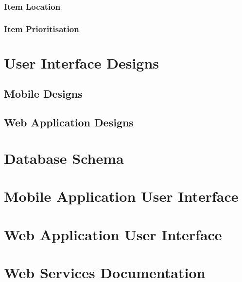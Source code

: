 \documentclass[a4paper,11pt]{report}
\begin{document}
\subsection{Item Location}

\subsection{Item Prioritisation}






\newpage
{}
\begin{appendix}
    \chapter{User Interface Designs}
    \section{Mobile Designs}
    \section{Web Application Designs}
    \chapter{Database Schema}
    \chapter{Mobile Application User Interface}
    \chapter{Web Application User Interface}
    \chapter{Web Services Documentation}
\end{appendix}
\end{document}
